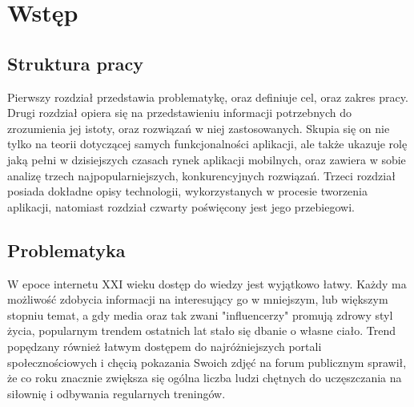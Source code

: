\documentclass[12pt, a4paper]{article}
\begin{document}
\begin{sloppypar}

\renewcommand\listfigurename{\section{Indeks rysunków}}
\newcommand*{\captionsource}[2]{%
  \caption[{#1}]{%
    #1%
    \\\hspace{\linewidth}%
    Źródło: #2%
  }%
}

\tableofcontents
\newpage

\section{Wstęp}
{
  \subsection{Struktura pracy}
  {
    Pierwszy rozdział przedstawia problematykę, oraz definiuje cel, oraz zakres pracy.
    Drugi rozdział opiera się na przedstawieniu informacji potrzebnych do zrozumienia
    jej istoty, oraz rozwiązań w niej zastosowanych. Skupia się on nie tylko na teorii
    dotyczącej samych funkcjonalności aplikacji, ale także ukazuje rolę jaką pełni w
    dzisiejszych czasach rynek aplikacji mobilnych, oraz zawiera w sobie analizę trzech
    najpopularniejszych, konkurencyjnych rozwiązań. Trzeci rozdział posiada dokładne opisy
    technologii, wykorzystanych w procesie tworzenia aplikacji, natomiast rozdział czwarty
    poświęcony jest jego przebiegowi.
  }
  \subsection{Problematyka}
  {
    W epoce internetu XXI wieku dostęp do wiedzy jest wyjątkowo łatwy. Każdy ma możliwość
    zdobycia informacji na interesujący go w mniejszym, lub większym stopniu temat,
    a gdy media oraz tak zwani "influencerzy" promują zdrowy
    styl życia, popularnym trendem ostatnich lat stało się dbanie o własne ciało. 
    Trend popędzany również łatwym dostępem do najróżniejszych portali
    społecznościowych i chęcią pokazania Swoich zdjęć na forum publicznym sprawił, 
    że co roku znacznie zwiększa się ogólna liczba ludzi chętnych do uczęszczania na
    siłownię i odbywania regularnych treningów.

}}
\end{sloppypar}
\end{document}
